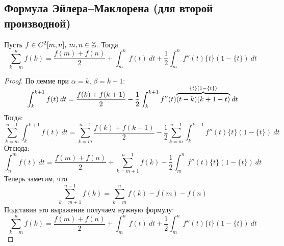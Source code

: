 \subsection{Формула Эйлера–Маклорена (для второй производной)}

\begin{theorem}
    Пусть $f \in C^2[m, n], \: m,n \in \mathbb{Z}$. Тогда
    \begin{equation*}
        \sum\limits_{k = m}^{n} f(k) = \frac{f(m) + f(n)}{2} +
        \int_{{m}}^{{n}} {f(t)} \: d{t} + \frac{1}{2}
        \int_{{m}}^{{n}} {f''(t)\{t\}(1 - \{t\})} \: d{t}
    \end{equation*}
\end{theorem}
\begin{proof}
  По лемме при $\alpha = k,\, \beta = k + 1$:
  \begin{equation*}
    \int_{{k}}^{{k + 1}} {f(t)} \: d{t} = \frac{f(k) + f(k + 1)}{2} -
    \frac{1}{2} \int_{{k}}^{{k + 1}} {f''(t)
    \smash{\overbrace{(t - k)(k + 1 - t)}^{\mathclap{\{t\}(1 - \{t\})}}}} \: d{t} {}
  \end{equation*}
  Тогда:
  \begin{equation*}
    \sum_{k = m}^{n - 1} \int_{{k}}^{{k + 1}} {f(t)} \: d{t} =
    \sum_{k = m}^{n - 1} \frac{f(k) + f(k + 1)}{2} -
    \frac{1}{2} \sum_{k = m}^{n - 1} \int_{{k}}^{{k + 1}}
    {f''(t)\{t\}(1 - \{t\})} \: d{t}
  \end{equation*}
  Отсюда:
  \begin{equation*}
    \int_{{n}}^{{m}} {f(t)} \: d{t} = \frac{f(m) + f(n)}{2} +
    \sum_{k = {m + 1}}^{n - 1} f(k) -
    \frac{1}{2} \int_{{m}}^{{n}} {f''(t)\{t\}(1 - \{t\})} \: d{t}
  \end{equation*}
  Теперь заметим, что
  \begin{equation*}
    \sum\limits_{k = m + 1}^{n - 1} f(k)
    = \sum\limits_{k = m}^{n} f(k) - f(m) - f(n)
  \end{equation*}
  Подставив это выражение получаем нужную формулу:
  \begin{equation*}
    \sum\limits_{k = m}^{n} f(k) = \frac{f(m) + f(n)}{2} +
    \int_{{m}}^{{n}} {f(t)} \: d{t} + \frac{1}{2}
    \int_{{m}}^{{n}} {f''(t)\{t\}(1 - \{t\})} \: d{t}
  \end{equation*}
\end{proof}